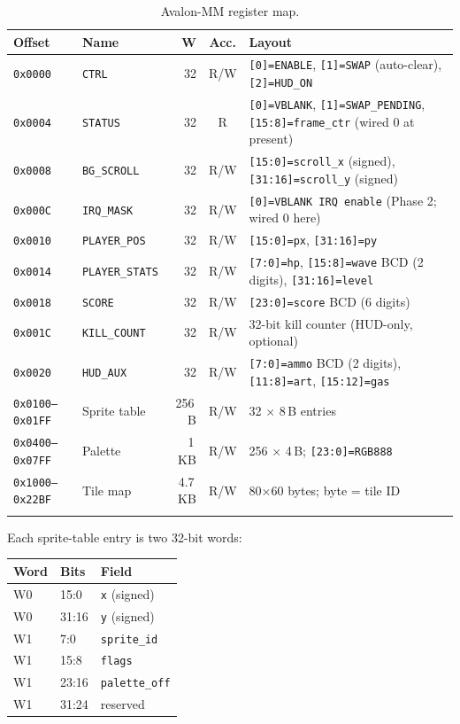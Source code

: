 \documentclass[11pt,letterpaper]{article}
\begin{document}
\begin{longtable}{lp{2.7cm}rcp{6.6cm}}
\toprule
Offset & Name & W & Acc. & Layout \\
\midrule
\endhead
\texttt{0x0000} & \texttt{CTRL} & 32 & R/W & \texttt{[0]=ENABLE}, \texttt{[1]=SWAP} (auto-clear), \texttt{[2]=HUD\_ON} \\
\texttt{0x0004} & \texttt{STATUS} & 32 & R & \texttt{[0]=VBLANK}, \texttt{[1]=SWAP\_PENDING}, \texttt{[15:8]=frame\_ctr} (wired 0 at present) \\
\texttt{0x0008} & \texttt{BG\_SCROLL} & 32 & R/W & \texttt{[15:0]=scroll\_x} (signed), \texttt{[31:16]=scroll\_y} (signed) \\
\texttt{0x000C} & \texttt{IRQ\_MASK} & 32 & R/W & \texttt{[0]=VBLANK IRQ enable} (Phase 2; wired 0 here) \\
\texttt{0x0010} & \texttt{PLAYER\_POS} & 32 & R/W & \texttt{[15:0]=px}, \texttt{[31:16]=py} \\
\texttt{0x0014} & \texttt{PLAYER\_STATS} & 32 & R/W & \texttt{[7:0]=hp}, \texttt{[15:8]=wave} BCD (2 digits), \texttt{[31:16]=level} \\
\texttt{0x0018} & \texttt{SCORE} & 32 & R/W & \texttt{[23:0]=score} BCD (6 digits) \\
\texttt{0x001C} & \texttt{KILL\_COUNT} & 32 & R/W & 32-bit kill counter (HUD-only, optional) \\
\texttt{0x0020} & \texttt{HUD\_AUX} & 32 & R/W & \texttt{[7:0]=ammo} BCD (2 digits), \texttt{[11:8]=art}, \texttt{[15:12]=gas} \\
\texttt{0x0100--0x01FF} & Sprite table & 256\,B & R/W & 32 $\times$ 8\,B entries \\
\texttt{0x0400--0x07FF} & Palette & 1\,KB & R/W & 256 $\times$ 4\,B; \texttt{[23:0]=RGB888} \\
\texttt{0x1000--0x22BF} & Tile map & 4.7\,KB & R/W & 80$\times$60 bytes; byte = tile ID \\
\bottomrule
\caption{Avalon-MM register map.}\label{tab:regmap}
\end{longtable}

Each sprite-table entry is two 32-bit words:

\begin{table}[h]
\centering
\begin{tabular}{lll}
\toprule
Word & Bits & Field \\
\midrule
W0 & 15:0 & \texttt{x} (signed) \\
W0 & 31:16 & \texttt{y} (signed) \\
W1 & 7:0 & \texttt{sprite\_id} \\
W1 & 15:8 & \texttt{flags} \\
W1 & 23:16 & \texttt{palette\_off} \\
W1 & 31:24 & reserved \\
\bottomrule
\end{tabular}
\end{table}
\end{document}
